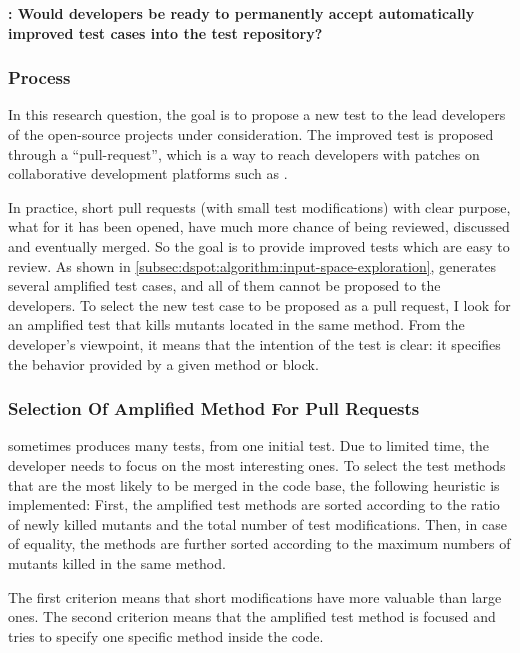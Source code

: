 \textbf{\rqpullrequest: Would developers be ready to permanently accept automatically improved test cases into the test repository?}

\subsubsection{Process}
\label{subsubsec:test-improvement:experiment-results:rq1:process}

In this research question, the goal is to propose a new test to the lead developers of the open-source projects under consideration. 
The improved test is proposed through a ``pull-request'', which is a way to reach developers with patches on collaborative development platforms such as \gh.

In practice, short pull requests (\ie with small test modifications) with clear purpose, \ie what for it has been opened, have much more chance of being reviewed, discussed and eventually merged. 
So the goal is to provide improved tests which are easy to review.
As shown in \autoref{subsec:dspot:algorithm:input-space-exploration}, \dspot generates several amplified test cases, and all of them cannot be proposed to the developers.
To select the new test case to be proposed as a pull request, I look for an amplified test that kills mutants located in the same method.
From the developer's viewpoint, it means that the intention of the test is clear: it specifies the behavior provided by a given method or block.

\subsubsection{Selection Of Amplified Method For Pull Requests}
\label{subsubsec:test-improvement:experiment-results:rq1:selection}

\dspot sometimes produces many tests, from one initial test.
Due to limited time, the developer needs to focus on the most interesting ones.
To select the test methods that are the most likely to be merged in the code base, the following heuristic is implemented:
First, the amplified test methods are sorted according to the ratio of newly killed mutants and the total number of test modifications.
Then, in case of equality, the methods are further sorted according to the maximum numbers of mutants killed in the same method.

The first criterion means that short modifications have more valuable than large ones.
The second criterion means that the amplified test method is focused and tries to specify one specific method inside the code.

